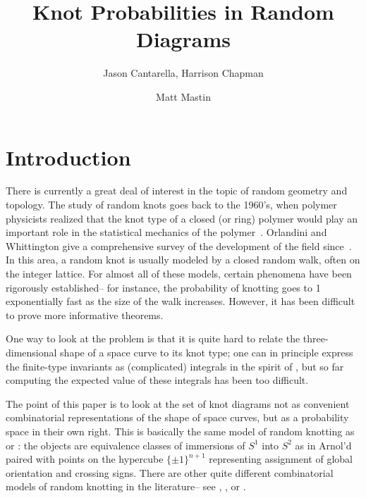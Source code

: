 \documentclass[amsmath,secnumarabic,floatfix,amssymb,nofootinbib,nobibnotes,letterpaper,11pt,tightenlines,showkeys]{revtex4}
\theoremstyle{definition}
\begin{document}
\title[]{Knot Probabilities in Random Diagrams}
\author{Jason Cantarella, Harrison Chapman}
\noaffiliation
\author{Matt Mastin}
\noaffiliation

\maketitle

\section{Introduction}

There is currently a great deal of interest in the topic of random geometry and topology. The study of random knots goes back to the 1960's, when polymer physicists realized that the knot type of a closed (or ring) polymer would play an important role in the statistical mechanics of the polymer~\cite{Edwards:1967hd}. Orlandini and Whittington give a comprehensive survey of the development of the field since~\cite{Orlandini:2007kn}. In this area, a random knot is usually modeled by a closed random walk, often on the integer lattice. For almost all of these models, certain phenomena have been rigorously established-- for instance, the probability of knotting goes to 1 exponentially fast as the size of the walk increases. However, it has been difficult to prove more informative theorems. 

One way to look at the problem is that it is quite hard to relate the three-dimensional shape of a space curve to its knot type; one can in principle express the finite-type invariants as (complicated) integrals in the spirit of \cite{Lin:1994wq}, but so far computing the expected value of these integrals has been too difficult. 

The point of this paper is to look at the set of knot diagrams not as convenient combinatorial representations of the shape of space curves, but as a probability space in their own right. This is basically the same model of random knotting as \cite{Dunfield:mdWrGjny} or \cite{Diao:2005tp}: the objects are equivalence classes of immersions of $S^1$ into $S^2$ as in Arnol'd~\cite{Arnold:1994wr} paired with points on the hypercube $\{\pm 1\}^{n+1}$ representing assignment of global orientation and crossing signs. There are other quite different combinatorial models of random knotting in the literature-- see \cite{Cohen:2015wz}, \cite{EvenZohar:2014ws}, or \cite{Nechaev:1996gv}. 
\end{document}
